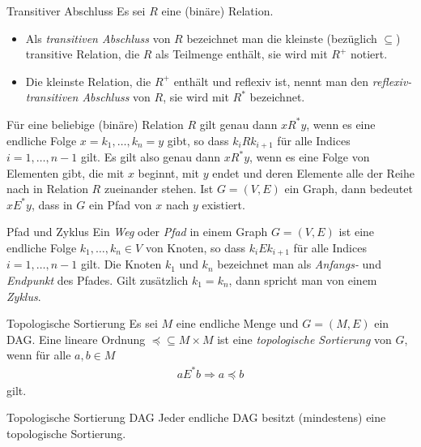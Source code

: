 \begin{definition}{Transitiver Abschluss}
    Es sei $R$ eine (bin\"are) Relation.
    \begin{itemize}
        \item Als \textit{transitiven Abschluss} von $R$ bezeichnet man die kleinste
            (bezüglich $\subseteq$) transitive Relation, die $R$ als Teilmenge enthält,
            sie wird mit $R^+$ notiert.
        \item Die kleinste Relation, die $R^+$ enthält und reflexiv ist, nennt man den
            \textit{reflexiv-transitiven Abschluss} von $R$, sie wird mit $R^*$ bezeichnet.
    \end{itemize}
\end{definition}

\begin{remark}
    F\"ur eine beliebige (bin\"are) Relation $R$ gilt genau dann $xR^*y$, wenn es
    eine endliche Folge $x=k_1,\dots,k_n=y$ gibt, so dass $k_iRk_{i+1}$ f\"ur alle
    Indices $i=1,\dots,n-1$ gilt. Es gilt also genau dann $xR^*y$, wenn es eine Folge von
    Elementen gibt, die mit $x$ beginnt, mit $y$ endet und deren Elemente alle der Reihe
    nach in Relation $R$ zueinander stehen. Ist $G=(V,E)$ ein Graph, dann bedeutet
    $xE^*y$, dass in $G$ ein Pfad von $x$ nach $y$ existiert.
\end{remark}

\begin{definition} {Pfad und Zyklus}
    Ein \textit{Weg} oder \textit{Pfad} in einem Graph $G=(V,E)$ ist eine endliche Folge
    $k_1,\dots,k_n\in V$ von Knoten, so dass $k_iEk_{i+1}$ f\"ur alle Indices
    $i=1,\dots,n-1$ gilt. Die Knoten $k_1$ und $k_n$ bezeichnet man als \textit{Anfangs-}
    und \textit{Endpunkt} des Pfades. Gilt zusätzlich $k_1=k_n$, dann spricht man von einem \textit{Zyklus}.
\end{definition}

\begin{definition}{Topologische Sortierung}
    Es sei $M$ eine endliche Menge und $G=(M,E)$ ein DAG. Eine lineare Ordnung $\preceq\subseteq M\times M$ ist eine \textit{topologische Sortierung} von $G$, wenn für alle $a,b\in M$
    \begin{align*}
        a E^* b  \Rightarrow a\preceq b
    \end{align*}
    gilt.
\end{definition}

\begin{lemma}{Topologische Sortierung DAG}
    Jeder endliche DAG besitzt (mindestens) eine topologische Sortierung.
\end{lemma}

